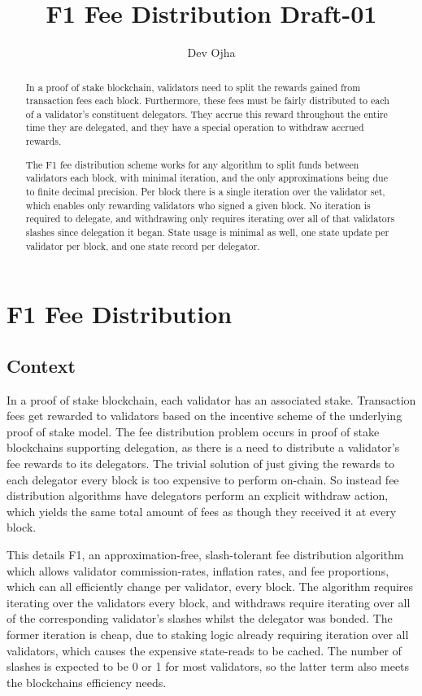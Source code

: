 \documentclass[]{article}
\title{F1 Fee Distribution Draft-01}
\author{Dev Ojha}
\begin{document}
\maketitle

\begin{abstract}
	In a proof of stake blockchain, validators need to split the rewards gained from transaction fees each block. Furthermore, these fees must be fairly distributed to each of a validator's constituent delegators. They accrue this reward throughout the entire time they are delegated, and they have a special operation to withdraw accrued rewards.
	
	The F1 fee distribution scheme works for any algorithm to split funds between validators each block, with minimal iteration, and the only approximations being due to finite decimal precision. Per block there is a single iteration over the validator set, which enables only rewarding validators who signed a given block. No iteration is required to delegate, and withdrawing only requires iterating over all of that validators slashes since delegation it began. State usage is minimal as well, one state update per validator per block, and one state record per delegator.
\end{abstract}

\section{F1 Fee Distribution}

\subsection{Context}
In a proof of stake blockchain, each validator has an associated stake.
Transaction fees get rewarded to validators based on the incentive scheme of the underlying proof of stake model.
The fee distribution problem occurs in proof of stake blockchains supporting delegation, as there is a need to distribute a validator's fee rewards to its delegators.
The trivial solution of just giving the rewards to each delegator every block is too expensive to perform on-chain.
So instead fee distribution algorithms have delegators perform an explicit withdraw action, which yields the same total amount of fees as though they received it at every block. 

This details F1, an approximation-free, slash-tolerant fee distribution algorithm which allows validator commission-rates, inflation rates, and fee proportions, which can all efficiently change per validator, every block.
The algorithm requires iterating over the validators every block, and withdraws require iterating over all of the corresponding validator's slashes whilst the delegator was bonded.
The former iteration is cheap, due to staking logic already requiring iteration over all validators, which causes the expensive state-reads to be cached.
The number of slashes is expected to be 0 or 1 for most validators,
so the latter term also meets the blockchains efficiency needs.
\end{document}
